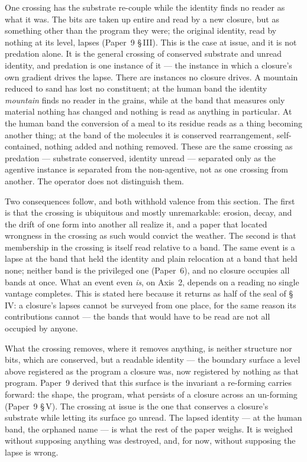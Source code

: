 \documentclass[11pt,oneside]{report}
\theoremstyle{definition}
\theoremstyle{remark}
\begin{document}
One crossing has the substrate re-couple while the identity finds no reader as what it was. The bits are taken up entire and read by a new closure, but as something other than the program they were; the original identity, read by nothing at its level, lapses (Paper~9 \S\,III). This is the case at issue, and it is not predation alone. It is the general crossing of conserved substrate and unread identity, and predation is one instance of it --- the instance in which a closure's own gradient drives the lapse. There are instances no closure drives. A mountain reduced to sand has lost no constituent; at the human band the identity \emph{mountain} finds no reader in the grains, while at the band that measures only material nothing has changed and nothing is read as anything in particular. At the human band the conversion of a meal to its residue reads as a thing becoming another thing; at the band of the molecules it is conserved rearrangement, self-contained, nothing added and nothing removed. These are the same crossing as predation --- substrate conserved, identity unread --- separated only as the agentive instance is separated from the non-agentive, not as one crossing from another. The operator does not distinguish them.

Two consequences follow, and both withhold valence from this section. The first is that the crossing is ubiquitous and mostly unremarkable: erosion, decay, and the drift of one form into another all realize it, and a paper that located wrongness in the crossing as such would convict the weather. The second is that membership in the crossing is itself read relative to a band. The same event is a lapse at the band that held the identity and plain relocation at a band that held none; neither band is the privileged one (Paper~6), and no closure occupies all bands at once. What an event even \emph{is}, on Axis~2, depends on a reading no single vantage completes. This is stated here because it returns as half of the seal of \S\,IV: a closure's lapses cannot be surveyed from one place, for the same reason its contributions cannot --- the bands that would have to be read are not all occupied by anyone.

What the crossing removes, where it removes anything, is neither structure nor bits, which are conserved, but a readable identity --- the boundary surface a level above registered as the program a closure was, now registered by nothing as that program. Paper~9 derived that this surface is the invariant a re-forming carries forward: the shape, the program, what persists of a closure across an un-forming (Paper~9 \S\,V). The crossing at issue is the one that conserves a closure's substrate while letting its surface go unread. The lapsed identity --- at the human band, the orphaned name --- is what the rest of the paper weighs. It is weighed without supposing anything was destroyed, and, for now, without supposing the lapse is wrong.
\end{document}
